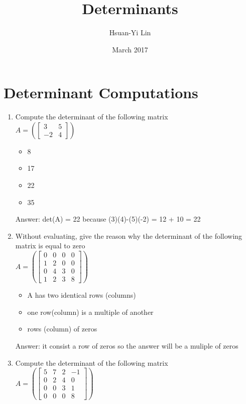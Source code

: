 \documentclass{article}
\title{Determinants}
\author{Hsuan-Yi Lin }
\date{March 2017}
\begin{document}
\maketitle

\section{Determinant Computations}
\begin{enumerate}
    \item Compute the determinant of the following matrix \\
    $A= \left( \begin{bmatrix} 3&5\\ -2& 4\end{bmatrix} \right)$
 
         \begin{itemize}
            \item 8
            \item 17
            \item 22
            \item 35
        \end{itemize}
        
        Answer: det(A) = 22 because 
        (3)(4)-(5)(-2) = 12 + 10 = 22
    
    \item Without evaluating, give the reason why the determinant of the following matrix is equal to zero \\
        $A = \left( \begin{bmatrix} 0& 0& 0& 0\\ 1& 2& 0& 0\\ 0& 4& 3& 0\\ 1& 2& 3& 8\end{bmatrix} \right)$
    
        \begin{itemize}
            \item A has two identical rows (columns)
            \item one row(column) is a multiple of another
            \item rows (column) of zeros
        \end{itemize}    
    
        Answer: it consist a row of zeros so the answer will be a muliple of zeros
        
    \item Compute the determinant of the following matrix \\
        $A = \left( \begin{bmatrix} 5& 7& 2& -1\\ 0& 2& 4& 0\\ 0& 0& 3& 1\\ 0& 0& 0& 8\end{bmatrix} \right)$
        

\end{enumerate}
\end{document}
